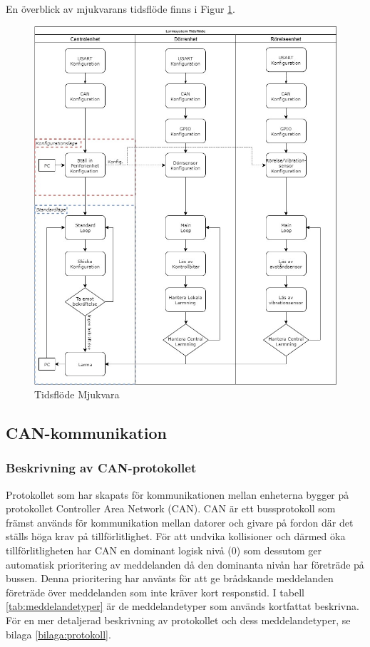 \documentclass{article}
\begin{document}
En överblick av mjukvarans tidsflöde finns i Figur \ref{fig:tidsflöde}.

\begin{figure}[H]
    \centering
    \includegraphics[width=1\textwidth]{figurer/TidsFlode.jpg}
    \caption{Tidsflöde Mjukvara}
    \label{fig:tidsflöde}
\end{figure}

\subsection{CAN-kommunikation}
\label{can}
\subsubsection{Beskrivning av CAN-protokollet}
Protokollet som har skapats för kommunikationen mellan enheterna bygger på protokollet Controller Area Network (CAN).
CAN är ett bussprotokoll som främst används för kommunikation mellan datorer och givare på fordon där det ställs höga krav på tillförlitlighet.
För att undvika kollisioner och därmed öka tillförlitligheten har CAN en dominant logisk nivå (0) som dessutom ger automatisk prioritering av meddelanden då den dominanta nivån har företräde på bussen.
Denna prioritering har använts för att ge brådskande meddelanden företräde över meddelanden som inte kräver kort responstid. I tabell \ref{tab:meddelandetyper} är de meddelandetyper som används kortfattat beskrivna. För en mer detaljerad beskrivning av protokollet och dess meddelandetyper, se bilaga \ref{bilaga:protokoll}.
\end{document}
